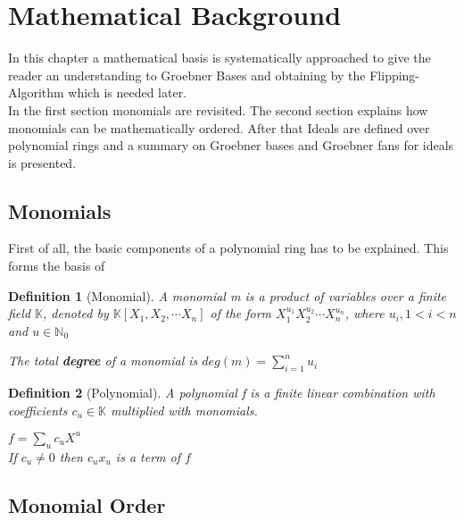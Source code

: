 \section{Mathematical Background}
\label{sec:background}

In this chapter a mathematical basis is systematically approached to give the reader an understanding to Groebner Bases and obtaining by the Flipping-Algorithm which is needed later.\\
In the first section monomials are revisited.
The second section explains how monomials can be mathematically ordered.
After that Ideals are defined over polynomial rings and a summary on Groebner bases and Groebner fans for ideals is presented.

\subsection{Monomials}
\label{subseb:Monomials}
\newtheorem{env_definition}{Definition}[section]

First of all, the basic components of a polynomial ring has to be explained. This forms the basis of

\begin{env_definition}[Monomial] 

A \emph{monomial m} is a product of variables over a finite field $\mathbb{K}$, denoted by $ \mathbb{K} \left[X_{1},X_{2},\cdots X_{n}\right]  $ of the form $X_{1}^{u_{1}}X_{2}^{u_{2}}\cdots X_{n}^{u_{n}}$, where $u_{i}, 1 < i < n $ and $u \in \mathbb{N}_{0} $

The total \textbf{degree} of a monomial is $deg(m) = \sum_{i=1}^n u_i $ 
\end{env_definition}

\begin{env_definition}[Polynomial]

A polynomial f is a finite linear combination with coefficients $c_{u} \in \mathbb{K}$ multiplied with monomials.

$ f = \sum_{u} c_{u}X^{u}$\\

If $c_{u}\neq0$ then $c_{u}x_{u}$ is a term of $f$


\end{env_definition}


\subsection{Monomial Order}

